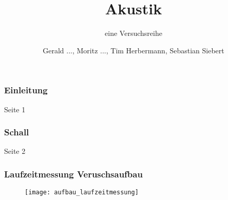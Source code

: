 \documentclass[11pt]{beamer}
\begin{document}
	\author{Gerald ..., Moritz ..., Tim Herbermann, Sebastian Siebert}
	\title{Akustik}
	\subtitle{eine Versuchsreihe}
	\frame[plain]{\maketitle}
	
	\begin{frame}
		\frametitle{Einleitung}
		Seite 1
	\end{frame}
	\begin{frame}
		\frametitle{Schall}
		Seite 2
	\end{frame}
	\begin{frame}
		\frametitle{Laufzeitmessung \qquad Veruschsaufbau}
		\begin{figure}
			\texttt{[image: aufbau\_laufzeitmessung]}
		\end{figure}
	\end{frame}
\end{document}
